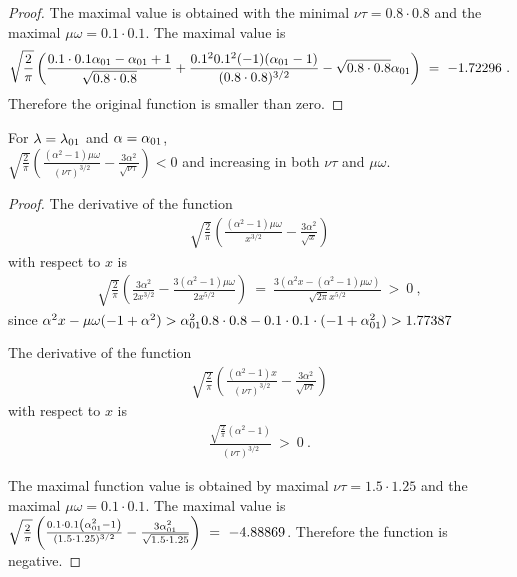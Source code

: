 \documentclass{article}
\begin{document}
\begin{proof}
The maximal value is obtained with the minimal $\nu
\tau=0.8 \cdot 0.8$ and the maximal  $\mu \omega=0.1 \cdot 0.1$.
The maximal value is
\begin{align}
\sqrt{\frac{2}{\pi }} \left(\frac{0.1 \cdot 0.1 \alpha_{\rm 01}-\alpha_{\rm 01}+1}{\sqrt{0.8 \cdot 0.8}}+\frac{0.1^2 0.1^2 (-1)
  (\alpha_{\rm 01}-1)}{(0.8 \cdot 0.8)^{3/2}}-\sqrt{0.8 \cdot 0.8}
  \alpha_{\rm 01}\right) \ = \ -1.72296 \ .
\end{align}
Therefore the original function is smaller than zero.
\end{proof}



\begin{lemma}
\label{lem:F5}

For $\lambda=\lambda_{\rm 01}$ and $\alpha=\alpha_{\rm 01}$, \\
$\sqrt{\frac{2}{\pi }} \left(\frac{\left(\alpha ^2-1\right) \mu \omega}{(\nu \tau)^{3/2}}-\frac{3 \alpha ^2}{\sqrt{\nu \tau}}\right)<0$
and increasing in both $\nu \tau$ and $\mu \omega$.

\end{lemma}
\begin{proof}
The derivative of the function
\begin{align}
\sqrt{\frac{2}{\pi }} \left(\frac{\left(\alpha ^2-1\right) \mu \omega}{x^{3/2}}-\frac{3 \alpha ^2}{\sqrt{x}}\right)
\end{align}
with respect to $x$ is
\begin{align}
\sqrt{\frac{2}{\pi }} \left(\frac{3 \alpha^2}{2 x^{3/2}}-\frac{3
  \left(\alpha^2-1\right) \mu \omega}{2 x^{5/2}}\right)
\ = \ 
\frac{3 \left(\alpha^2 x-\left(\alpha^2-1\right) \mu
  \omega\right)}{\sqrt{2 \pi } x^{5/2}} \ > \ 0 \ ,
\end{align}
since
$\alpha^2 x- \mu \omega (-1+\alpha^2)> \alpha_{\rm 01}^2 0.8 \cdot 0.8- 0.1 \cdot 0.1 \cdot (-1+\alpha_{\rm 01}^2)>1.77387$

The derivative of the function
\begin{align}
\sqrt{\frac{2}{\pi }} \left(\frac{\left(\alpha ^2-1\right) x}{(\nu \tau)^{3/2}}-\frac{3 \alpha ^2}{\sqrt{\nu \tau}}\right)
\end{align}
with respect to $x$ is
\begin{align}
\frac{\sqrt{\frac{2}{\pi }} \left(\alpha ^2-1\right)}{(\nu \tau)^{3/2}} \ > \ 0 \ .
\end{align}

The maximal function value is obtained by maximal $\nu
\tau=1.5 \cdot 1.25$ and the maximal  $\mu \omega=0.1 \cdot 0.1$. 
The maximal value is
$\sqrt{\frac{2}{\pi }} \left(\frac{0.1 \cdot 0.1 \left(\alpha_{\rm 01}^2-1\right)}{(1.5 \cdot 1.25)^{3/2}} - 
\frac{3 \alpha_{\rm 01}^2}{\sqrt{1.5 \cdot 1.25}}\right) \ = \ -4.88869$.
Therefore the function is negative.
\end{proof}
\end{document}
